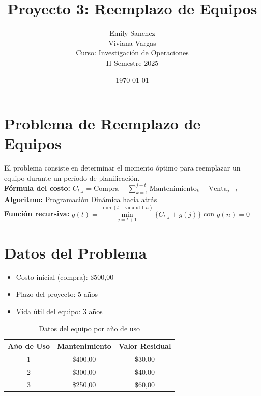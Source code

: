 \documentclass[12pt]{article}
\title{Proyecto 3: Reemplazo de Equipos}
\author{Emily Sanchez \\ Viviana Vargas \\[1cm] Curso: Investigación de Operaciones \\ II Semestre 2025}
\date{\today}
\begin{document}
\maketitle
\newpage
\section*{Problema de Reemplazo de Equipos}
El problema consiste en determinar el momento óptimo para reemplazar un equipo durante un período de planificación.\\
\textbf{Fórmula del costo:} $C_{t,j} = \text{Compra} + \sum_{k=1}^{j-t} \text{Mantenimiento}_k - \text{Venta}_{j-t}$\\
\textbf{Algoritmo:} Programación Dinámica hacia atrás\\
\textbf{Función recursiva:} $g(t) = \min\limits_{j=t+1}^{\min(t+\text{vida útil}, n)} \{C_{t,j} + g(j)\}$ con $g(n) = 0$\\

\section*{Datos del Problema}
\begin{itemize}
\item Costo inicial (compra): \$500,00
\item Plazo del proyecto: 5 años
\item Vida útil del equipo: 3 años
\end{itemize}

\begin{table}[H]
\centering
\caption{Datos del equipo por año de uso}
\begin{tabular}{ccc}
\toprule
Año de Uso & Mantenimiento & Valor Residual \\
\midrule
1 & \$400,00 & \$30,00 \\
2 & \$300,00 & \$40,00 \\
3 & \$250,00 & \$60,00 \\
\bottomrule
\end{tabular}
\end{table}

\clearpage
\end{document}
